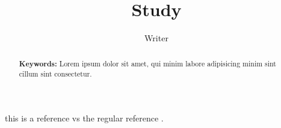 

\title{Study}
\author{Writer}
\date{}



    \maketitle

    \begin{abstract}
        \blindtext[2]

        \vspace{0.5\baselineskip}
        \noindent
        \textbf{Keywords:} Lorem ipsum dolor sit amet, qui minim labore adipisicing minim sint cillum sint consectetur.
    \end{abstract}

    \begin{multicols}{2}
        
        
        
        
        
    \end{multicols}

    \cite{mitlohner_characteristics_2016}

    this is a reference \citep{gaines_emotional_1983} vs the regular reference \cite{gaines_emotional_1983}.
    \nocite{*}

    \newpage
    



